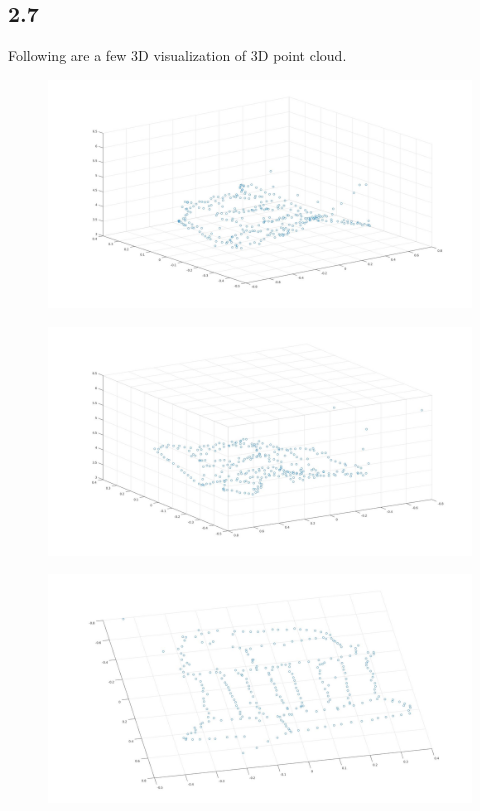 \documentclass{article}
\begin{document}
\subsection*{2.7}
Following are a few 3D visualization of 3D point cloud.
\begin{figure}[H]
    \centering
    \includegraphics[width=6.5in]{./figures/q2_7_1}
\end{figure}
\begin{figure}[H]
    \centering
    \includegraphics[width=6.5in]{./figures/q2_7_4}
\end{figure}
\begin{figure}[H]
    \centering
    \includegraphics[width=6.5in]{./figures/q2_7_2}
\end{figure}
\end{document}
